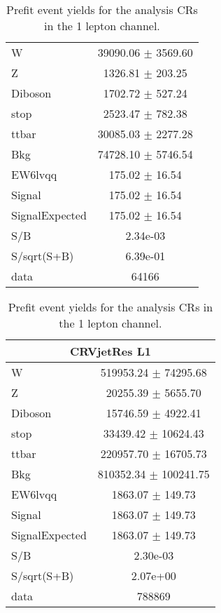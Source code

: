 \begin{table}
\begin{tabular}{|l|c|}
W & 39090.06 $\pm$ 3569.60\\
Z & 1326.81 $\pm$ 203.25\\
Diboson & 1702.72 $\pm$ 527.24\\
stop & 2523.47 $\pm$ 782.38\\
ttbar & 30085.03 $\pm$ 2277.28\\
\hline
Bkg & 74728.10 $\pm$ 5746.54\\
\hline
EW6lvqq & 175.02 $\pm$ 16.54\\
\hline
Signal & 175.02 $\pm$ 16.54\\
SignalExpected & 175.02 $\pm$ 16.54\\
\hline
S/B & 2.34e-03\\
S/sqrt(S+B) & 6.39e-01\\
\hline
data & 64166\\ \hline
\end{tabular}
\begin{tabular}{|l|c|}
\hline
\multicolumn{2}{|c|}{CRVjetRes L1}\\ \hline
W & 519953.24 $\pm$ 74295.68\\
Z & 20255.39 $\pm$ 5655.70\\
Diboson & 15746.59 $\pm$ 4922.41\\
stop & 33439.42 $\pm$ 10624.43\\
ttbar & 220957.70 $\pm$ 16705.73\\
\hline
Bkg & 810352.34 $\pm$ 100241.75\\
\hline
EW6lvqq & 1863.07 $\pm$ 149.73\\
\hline
Signal & 1863.07 $\pm$ 149.73\\
SignalExpected & 1863.07 $\pm$ 149.73\\
\hline
S/B & 2.30e-03\\
S/sqrt(S+B) & 2.07e+00\\
\hline
data & 788869\\ \hline
\end{tabular}
\caption{Prefit event yields for the analysis CRs in the 1 lepton channel.}
\label{tab:1lepPrefitYield_CR}
\end{table}
~
